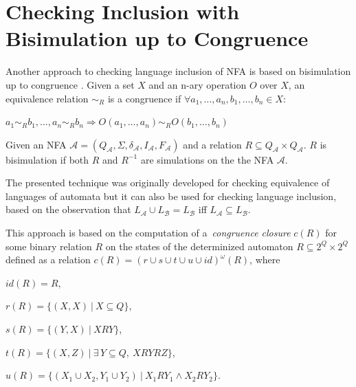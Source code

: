 \section{Checking Inclusion with Bisimulation up to Congruence}
\label{sectionCongr}
Another approach to checking language inclusion of NFA is based on bisimulation up to congruence \cite{popl13}.
Given a set $X$ and an n-ary operation $O$ over $X$, an equivalence relation $\sim_R$ is a congruence if $\forall a_1,\ldots,a_n,b_1,\ldots,b_n\in X$:
		\begin{description}
			\item $a_1 \sim_{R} b_1,\ldots,a_n \sim_{R} b_n \Rightarrow O(a_1,\ldots,a_n) \sim_{R} O(b_1,\ldots,b_n)$
		\end{description}
Given an NFA $\mathcal{A}=(Q_\mathcal{A},\Sigma,\delta_\mathcal{A},I_\mathcal{A},F_\mathcal{A})$ and a relation 
$R\subseteq Q_\mathcal{A}\times Q_\mathcal{A}$. $R$ is bisimulation if both $R$ and $R^{-1}$ are simulations on the the NFA $\mathcal{A}$.

The presented technique was originally developed for checking equivalence of languages of automata but it can
also be used for checking language inclusion, based on the observation that $L_\mathcal{A}\cup L_\mathcal{B}= L_\mathcal{B}$ iff 
$L_\mathcal{A}\subseteq L_\mathcal{B}$.

  This approach is based on the computation of a~\emph{congruence closure} $c(R)$ 
  for some binary relation $R$ on the states of the determinized automaton $R \subseteq 2^Q\times 2^Q$ defined 
  as a relation $c(R)=(r\cup s\cup t \cup u\cup id)^{\omega}(R)$, where
  \begin{description}
  \item $id(R)=R$, 
  \item $r(R)=\{(X,X)\ |\ X\subseteq Q\}$, 
  \item $s(R)=\{(Y,X)\ |\ XRY\}$,
  \item $t(R)=\{(X,Z)\ |\ \exists\,Y\subseteq Q,\ XRYRZ\}$,
  \item $u(R)=\{(X_1 \cup X_2,Y_1\cup Y_2)\ |\ X_1 R Y_1 \wedge X_2 R Y_2\}$. 
  \end{description}



